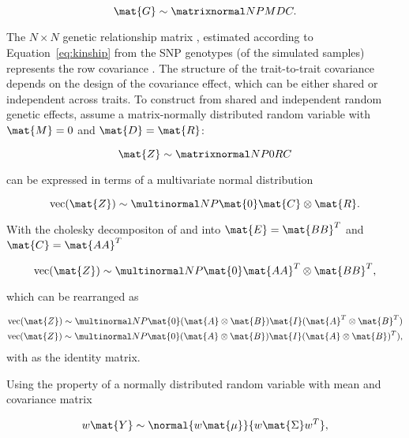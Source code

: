 \begin{enumerate}
\begin{equation}
\mat{G} \sim \matrixnormal N P M D C.
\end{equation}

The \(N \times N\) genetic relationship matrix , estimated according to Equation~\ref{eq:kinship} from the SNP genotypes (of the simulated samples) represents the row covariance .  The structure of the trait-to-trait covariance  depends on the design of the covariance effect, which can be either shared or independent across traits. To construct  from shared and independent random genetic effects, assume a matrix-normally distributed random variable  with \(\mat{M}=0\)  and \(\mat{D} = \mat{R}\):

\begin{equation}
\mat{Z} \sim  \matrixnormal N P 0 R C
\end{equation}

 can be expressed in terms of a multivariate normal distribution 

\begin{equation}
\text{vec}(\mat{Z}) \sim \multinormal N P {\mat{0}} {\mat{C} \otimes \mat{R}}.
\end{equation}

With the cholesky decompositon of  and  into  \(\mat{E}=\mat{BB}^T\) and \(\mat{C}=\mat{AA}^T\) 

\begin{equation}
\text{vec}(\mat{Z}) \sim \multinormal N P {\mat{0}} {\mat{AA}^T  \otimes \mat{BB}^T},  
\end{equation}

which can be rearranged as 

\begin{equation}
\begin{aligned}
\text{vec}(\mat{Z}) \sim \multinormal N P {\mat{0}} {(\mat{A} \otimes \mat{B}) \mat{I} (\mat{A}^T \otimes \mat{B}^T)} \\
\text{vec}(\mat{Z})  \sim \multinormal N P {\mat{0}} {(\mat{A }\otimes \mat{B}) \mat{I} (\mat{A} \otimes\mat{B})^T)}, 
\end{aligned}
\end{equation}
with  as the identity matrix.
 
Using the property of a normally distributed random variable  with mean \tmat{\mu} and covariance matrix \tmat{\Sigma}

\begin{equation}
\begin{aligned} 
w \mat{Y} \sim \normal {w\mat{\mu}}  {w\mat{\Sigma} w^T},
\end{aligned}
\end{equation}


\end{enumerate}
